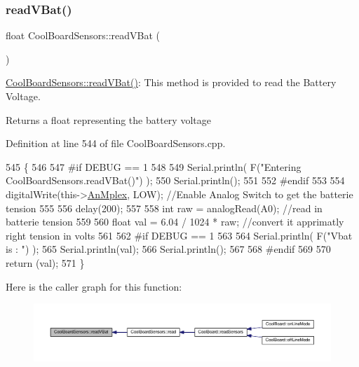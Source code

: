 \subsubsection{\texorpdfstring{read\+V\+Bat()}{readVBat()}}
{\footnotesize\ttfamily float Cool\+Board\+Sensors\+::read\+V\+Bat (\begin{DoxyParamCaption}{ }\end{DoxyParamCaption})}

\hyperlink{class_cool_board_sensors_a6944b6ea7bce8e2fce1b434acfd9d5f3}{Cool\+Board\+Sensors\+::read\+V\+Bat()}\+: This method is provided to read the Battery Voltage.

\begin{DoxyReturn}{Returns}
a float representing the battery voltage 
\end{DoxyReturn}


Definition at line 544 of file Cool\+Board\+Sensors.\+cpp.


\begin{DoxyCode}
545 \{
546 
547 \textcolor{preprocessor}{#if DEBUG == 1}
548 
549     Serial.println( F(\textcolor{stringliteral}{"Entering CoolBoardSensors.readVBat()"}) );
550     Serial.println();
551 
552 \textcolor{preprocessor}{#endif}
553 
554     digitalWrite(this->\hyperlink{class_cool_board_sensors_a12ef28b1046219e0aee10bf64e28c4a5}{AnMplex}, LOW);                            \textcolor{comment}{//Enable Analog Switch to get the
       batterie tension}
555     
556     delay(200);
557     
558     \textcolor{keywordtype}{int} raw = analogRead(A0);                                    \textcolor{comment}{//read in batterie tension}
559     
560     \textcolor{keywordtype}{float} val = 6.04 / 1024 * raw;                               \textcolor{comment}{//convert it apprimatly right tension in
       volts}
561     
562 \textcolor{preprocessor}{#if DEBUG == 1}
563 
564     Serial.println( F(\textcolor{stringliteral}{"Vbat is : "}) );
565     Serial.println(val);
566     Serial.println();
567 
568 \textcolor{preprocessor}{#endif}
569 
570     \textcolor{keywordflow}{return} (val);   
571 \}
\end{DoxyCode}
Here is the caller graph for this function\+:\nopagebreak
\begin{figure}[H]
\begin{center}
\leavevmode
\includegraphics[width=350pt]{de/d46/class_cool_board_sensors_a6944b6ea7bce8e2fce1b434acfd9d5f3_icgraph}
\end{center}
\end{figure}
\mbox{\label{class_cool_board_sensors_a406307ffd70272282d91479c7ed8d66f}} 
